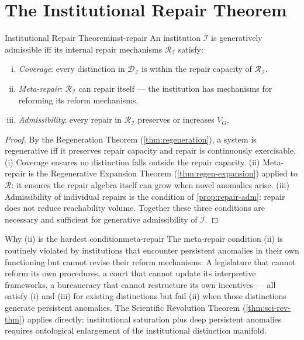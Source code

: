 \documentclass[12pt,twoside,openright]{book}
\begin{document}
\section{The Institutional Repair Theorem}

\begin{theorem}{Institutional Repair Theorem}{inst-repair}
  An institution $\mathcal{I}$ is generatively
  admissible iff its internal repair mechanisms
  $\mathcal{R}_\mathcal{I}$ satisfy:
  \begin{enumerate}[(i)]
    \item \emph{Coverage}: every distinction in
          $\mathcal{D}_\mathcal{I}$ is within the
          repair capacity of $\mathcal{R}_\mathcal{I}$.
    \item \emph{Meta-repair}: $\mathcal{R}_\mathcal{I}$
          can repair itself — the institution has
          mechanisms for reforming its reform mechanisms.
    \item \emph{Admissibility}: every repair in
          $\mathcal{R}_\mathcal{I}$ preserves or
          increases $V_G$.
  \end{enumerate}
\end{theorem}

\begin{proof}
  By the Regeneration Theorem (\cref{thm:regeneration}),
  a system is regenerative iff it preserves repair
  capacity and repair is continuously exercisable.
  (i) Coverage ensures no distinction falls outside
  the repair capacity.
  (ii) Meta-repair is the Regenerative Expansion Theorem
  (\cref{thm:regen-expansion}) applied to $\mathcal{R}$:
  it ensures the repair algebra itself can grow when
  novel anomalies arise.
  (iii) Admissibility of individual repairs is the
  condition of \cref{prop:repair-adm}: repair does not
  reduce reachability volume.
  Together these three conditions are necessary and
  sufficient for generative admissibility of
  $\mathcal{I}$.
\end{proof}

\begin{remark}{Why (ii) is the hardest condition}{meta-repair}
  The meta-repair condition (ii) is routinely violated
  by institutions that encounter persistent anomalies
  in their own functioning but cannot revise their
  reform mechanisms. A legislature that cannot reform
  its own procedures, a court that cannot update its
  interpretive frameworks, a bureaucracy that cannot
  restructure its own incentives — all satisfy (i)
  and (iii) for existing distinctions but fail (ii)
  when those distinctions generate persistent anomalies.
  The Scientific Revolution Theorem
  (\cref{thm:sci-rev-thm}) applies directly:
  institutional saturation plus deep persistent
  anomalies requires ontological enlargement of the
  institutional distinction manifold.
\end{remark}
\end{document}
